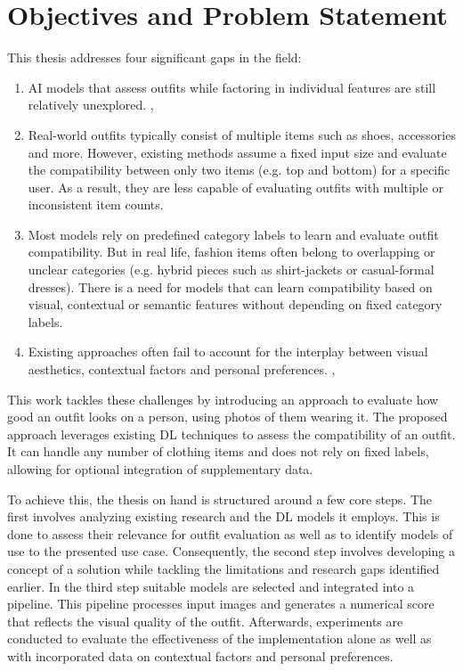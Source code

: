 \section{Objectives and Problem Statement}

This thesis addresses four significant gaps in the field:

\begin{enumerate}
\item \acs{AI} models that assess outfits while factoring in individual features are still relatively unexplored. \cite[cf.]{chen_survey_2023}, \cite[cf.]{deldjoo_review_2022}
\item Real-world outfits typically consist of multiple items such as shoes, accessories and more. However, existing methods assume a fixed input size and evaluate the compatibility between only two items (e.g. top and bottom) for a specific user. As a result, they are less capable of evaluating outfits with multiple or inconsistent item counts. \cite[cf.]{chen_survey_2023}
\item Most models rely on predefined category labels to learn and evaluate outfit compatibility. But in real life, fashion items often belong to overlapping or unclear categories (e.g. hybrid pieces such as shirt-jackets or casual-formal dresses). There is a need for models that can learn compatibility based on visual, contextual or semantic features without depending on fixed category labels. \cite[cf.]{chen_survey_2023}
\item Existing approaches often fail to account for the interplay between visual aesthetics, contextual factors and personal preferences. \cite[cf.]{chen_survey_2023}, \cite[cf.]{deldjoo_review_2022}
\end{enumerate}

This work tackles these challenges by introducing an approach to evaluate how good an outfit looks on a person, using photos of them wearing it. The proposed approach leverages existing \acs{DL} techniques to assess the compatibility of an outfit. It can handle any number of clothing items and does not rely on fixed labels, allowing for optional integration of supplementary data.

To achieve this, the thesis on hand is structured around a few core steps. The first involves analyzing existing research and the \acs{DL} models it employs. This is done to assess their relevance for outfit evaluation as well as to identify models of use to the presented use case. Consequently, the second step involves developing a concept of a solution while tackling the limitations and research gaps identified earlier. In the third step suitable models are selected and integrated into a pipeline. This pipeline processes input images and generates a numerical score that reflects the visual quality of the outfit. Afterwards, experiments are conducted to evaluate the effectiveness of the implementation alone as well as with incorporated data on contextual factors and personal preferences.

